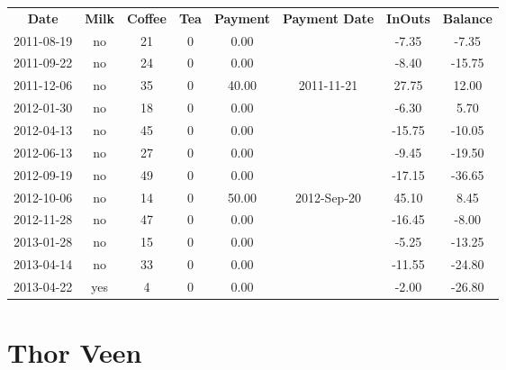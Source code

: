 \begin{center}
\begin{tabular}{cccccccc}
\textbf{Date} & \textbf{Milk} & \textbf{Coffee} & \textbf{Tea} & \textbf{Payment} & \textbf{Payment Date} & \textbf{InOuts} & \textbf{Balance} \\
2011-08-19 & no & 21 & 0 &  0.00 &  &  -7.35 &  -7.35\\ 
2011-09-22 & no & 24 & 0 &  0.00 &  &  -8.40 & -15.75\\ 
2011-12-06 & no & 35 & 0 & 40.00 & 2011-11-21 &  27.75 &  12.00\\ 
2012-01-30 & no & 18 & 0 &  0.00 &  &  -6.30 &   5.70\\ 
2012-04-13 & no & 45 & 0 &  0.00 &  & -15.75 & -10.05\\ 
2012-06-13 & no & 27 & 0 &  0.00 &  &  -9.45 & -19.50\\ 
2012-09-19 & no & 49 & 0 &  0.00 &  & -17.15 & -36.65\\ 
2012-10-06 & no & 14 & 0 & 50.00 & 2012-Sep-20 &  45.10 &   8.45\\ 
2012-11-28 & no & 47 & 0 &  0.00 &  & -16.45 &  -8.00\\ 
2013-01-28 & no & 15 & 0 &  0.00 &  &  -5.25 & -13.25\\ 
2013-04-14 & no & 33 & 0 &  0.00 &  & -11.55 & -24.80\\ 
2013-04-22 & yes &  4 & 0 &  0.00 &  &  -2.00 & -26.80
\end{tabular}
\end{center}

\section{Thor Veen}

